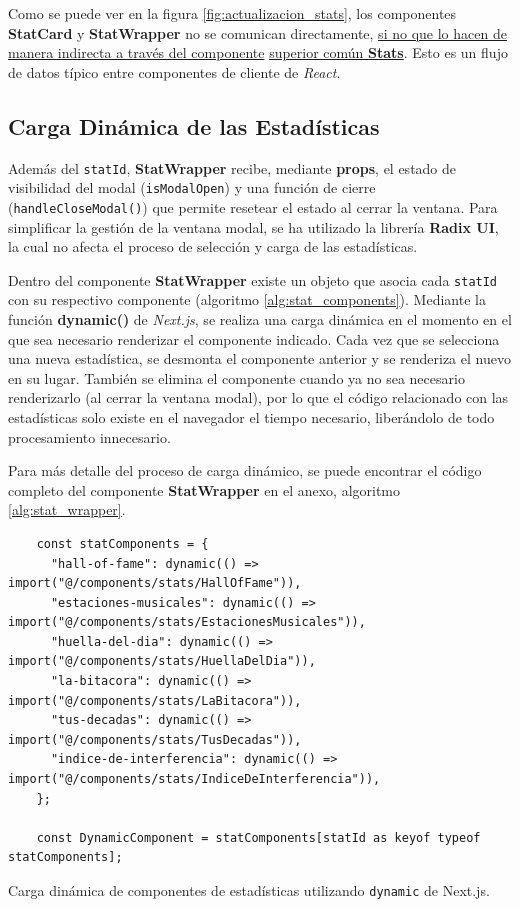 Como se puede ver en la figura \ref{fig:actualizacion_stats}, los componentes \textbf{StatCard} y \textbf{StatWrapper} no se comunican directamente, \underline{si no que lo hacen de manera indirecta a través del componente} \underline{superior común \textbf{Stats}}. Esto es un flujo de datos típico entre componentes de cliente de \textit{React}.

\subsection*{Carga Dinámica de las Estadísticas} \label{sub:carga_dinamica}

Además del \texttt{statId}, \textbf{StatWrapper} recibe, mediante \textbf{props}, el estado de visibilidad del modal (\texttt{isModalOpen}) y una función de cierre (\texttt{handleCloseModal()}) que permite resetear el estado al cerrar la ventana. Para simplificar la gestión de la ventana modal, se ha utilizado la librería \textbf{Radix UI}, la cual no afecta el proceso de selección y carga de las estadísticas.

Dentro del componente \textbf{StatWrapper} existe un objeto que asocia cada \texttt{statId} con su respectivo componente (algoritmo \ref{alg:stat_components}). Mediante la función \textbf{dynamic()} de \textit{Next.js}, se realiza una carga dinámica en el momento en el que sea necesario renderizar el componente indicado. Cada vez que se selecciona una nueva estadística, se desmonta el componente anterior y se renderiza el nuevo en su lugar. También se elimina el componente cuando ya no sea necesario renderizarlo (al cerrar la ventana modal), por lo que el código relacionado con las estadísticas solo existe en el navegador el tiempo necesario, liberándolo de todo procesamiento innecesario.

Para más detalle del proceso de carga dinámico, se puede encontrar el código completo del componente \textbf{StatWrapper} en el anexo, algoritmo \ref{alg:stat_wrapper}.

\begin{ifalgorithm}[H]
    \begin{lstlisting}
    const statComponents = {
      "hall-of-fame": dynamic(() => import("@/components/stats/HallOfFame")),
      "estaciones-musicales": dynamic(() => import("@/components/stats/EstacionesMusicales")),
      "huella-del-dia": dynamic(() => import("@/components/stats/HuellaDelDia")),
      "la-bitacora": dynamic(() => import("@/components/stats/LaBitacora")),
      "tus-decadas": dynamic(() => import("@/components/stats/TusDecadas")),
      "indice-de-interferencia": dynamic(() => import("@/components/stats/IndiceDeInterferencia")),
    };

    const DynamicComponent = statComponents[statId as keyof typeof statComponents];
    \end{lstlisting}
    \caption{Carga dinámica de componentes de estadísticas utilizando \texttt{dynamic} de Next.js.}
    \label{alg:stat_components}
\end{ifalgorithm}

